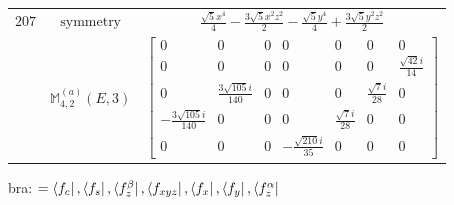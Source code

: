 \documentclass[fleqn,8pt,landscape]{jsarticle}
\begin{document}
\begin{longtable}{ccc}
$ 207 $ & $ \text{symmetry} $ & $ \frac{\sqrt{5} x^{4}}{4} - \frac{3 \sqrt{5} x^{2} z^{2}}{2} - \frac{\sqrt{5} y^{4}}{4} + \frac{3 \sqrt{5} y^{2} z^{2}}{2} $ \\
$  $ & $ \mathbb{M}_{4,2}^{(a)}(E,3) $ & $ \begin{bmatrix} 0 & 0 & 0 & 0 & 0 & 0 & 0 \\ 0 & 0 & 0 & 0 & 0 & 0 & \frac{\sqrt{42} i}{14} \\ 0 & \frac{3 \sqrt{105} i}{140} & 0 & 0 & 0 & \frac{\sqrt{7} i}{28} & 0 \\ - \frac{3 \sqrt{105} i}{140} & 0 & 0 & 0 & \frac{\sqrt{7} i}{28} & 0 & 0 \\ 0 & 0 & 0 & - \frac{\sqrt{210} i}{35} & 0 & 0 & 0 \end{bmatrix} $ \\ \hline
\end{longtable}
bra: $=\bra{f_{c}}, \bra{f_{s}}, \bra{f_{z}^{\beta}}, \bra{f_{xyz}}, \bra{f_{x}}, \bra{f_{y}}, \bra{f_{z}^{\alpha}}$
\end{document}
